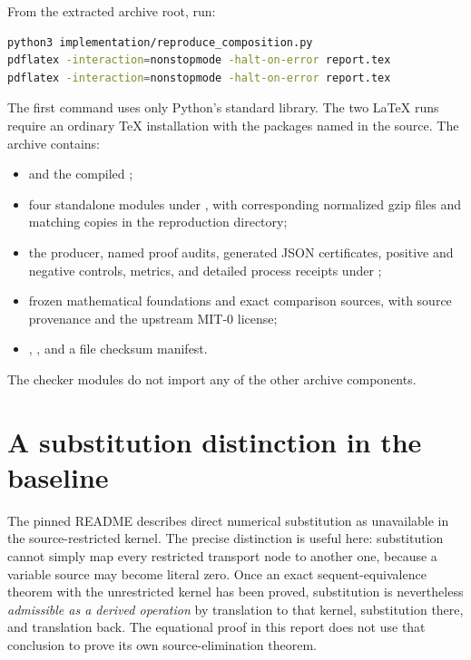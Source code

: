 \documentclass[11pt,letterpaper]{article}
\theoremstyle{definition}
\begin{document}
From the extracted archive root, run:
\begin{lstlisting}[language=bash]
python3 implementation/reproduce_composition.py
pdflatex -interaction=nonstopmode -halt-on-error report.tex
pdflatex -interaction=nonstopmode -halt-on-error report.tex
\end{lstlisting}
The first command uses only Python's standard library. The two LaTeX runs
require an ordinary TeX installation with the packages named in the source.
The archive contains:
\begin{itemize}
\item {} and the compiled ;
\item four standalone modules under , with corresponding
normalized gzip files and matching copies in the reproduction directory;
\item the producer, named proof audits, generated JSON certificates,
positive and negative controls, metrics, and detailed process receipts
under ;
\item frozen mathematical foundations and exact comparison sources,
with source provenance and the upstream MIT-0 license;
\item {}, , and a file checksum manifest.
\end{itemize}
The checker modules do not import any of the other archive components.

\section{A substitution distinction in the baseline}

The pinned README describes direct numerical substitution as unavailable
in the source-restricted kernel. The precise distinction is useful here:
substitution cannot simply map every restricted transport node to another
one, because a variable source may become literal zero. Once an exact
sequent-equivalence theorem with the unrestricted kernel has been proved,
substitution is nevertheless \emph{admissible as a derived operation} by
translation to that kernel, substitution there, and translation back.
The equational proof in this report does not use that conclusion to prove
its own source-elimination theorem.
\end{document}
